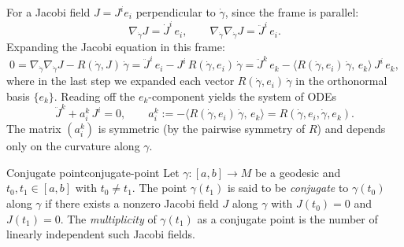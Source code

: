 For a Jacobi field $J = J^i e_i$ perpendicular to $\dot\gamma$, since the frame is parallel:
\[
\nabla_{\dot\gamma} J = \dot J^i\, e_i, \qquad \nabla_{\dot\gamma}\nabla_{\dot\gamma} J = \ddot J^i\, e_i.
\]
Expanding the Jacobi equation in this frame:
\[
0 = \nabla_{\dot\gamma}\nabla_{\dot\gamma} J - R(\dot\gamma, J)\,\dot\gamma = \ddot J^i\, e_i - J^i\, R(\dot\gamma, e_i)\,\dot\gamma = \ddot J^k\, e_k - \langle R(\dot\gamma, e_i)\,\dot\gamma,\, e_k\rangle\, J^i\, e_k,
\]
where in the last step we expanded each vector $R(\dot\gamma, e_i)\,\dot\gamma$ in the orthonormal basis $\{e_k\}$. Reading off the $e_k$-component yields the system of ODEs
\begin{equation}
    \label{eq:jacobi-component-form}
    \ddot J^k + a^k_i\, J^i = 0, \qquad a^k_i := -\langle R(\dot\gamma, e_i)\,\dot\gamma,\, e_k\rangle = R(\dot\gamma, e_i, \dot\gamma, e_k).
\end{equation}
The matrix $(a^k_i)$ is symmetric (by the pairwise symmetry of $R$) and depends only on the curvature along $\gamma$.








\begin{colordef}{Conjugate point}{conjugate-point}
Let $\gamma \colon [a, b] \to M$ be a geodesic and $t_0, t_1 \in [a, b]$ with $t_0 \neq t_1$. The point $\gamma(t_1)$ is said to be \emph{conjugate} to $\gamma(t_0)$ along $\gamma$ if there exists a nonzero Jacobi field $J$ along $\gamma$ with $J(t_0) = 0$ and $J(t_1) = 0$. The \emph{multiplicity} of $\gamma(t_1)$ as a conjugate point is the number of linearly independent such Jacobi fields.
\end{colordef}


